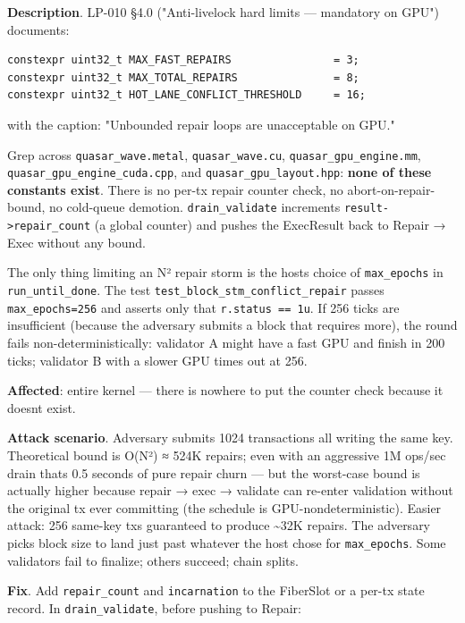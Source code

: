 \documentclass[
]{article}
\begin{document}
\textbf{Description}. LP-010 §4.0 ("Anti-livelock hard limits ---
mandatory on GPU") documents:

\begin{verbatim}
constexpr uint32_t MAX_FAST_REPAIRS                = 3;
constexpr uint32_t MAX_TOTAL_REPAIRS               = 8;
constexpr uint32_t HOT_LANE_CONFLICT_THRESHOLD     = 16;
\end{verbatim}

with the caption: "Unbounded repair loops are unacceptable on GPU."

Grep across \texttt{quasar\_wave.metal}, \texttt{quasar\_wave.cu},
\texttt{quasar\_gpu\_engine.mm}, \texttt{quasar\_gpu\_engine\_cuda.cpp},
and \texttt{quasar\_gpu\_layout.hpp}: \textbf{none of these constants
exist}. There is no per-tx repair counter check, no
abort-on-repair-bound, no cold-queue demotion. \texttt{drain\_validate}
increments \texttt{result-\textgreater{}repair\_count} (a global
counter) and pushes the ExecResult back to Repair → Exec without any
bound.

The only thing limiting an N² repair storm is the host\textquotesingle s
choice of \texttt{max\_epochs} in \texttt{run\_until\_done}. The test
\texttt{test\_block\_stm\_conflict\_repair} passes
\texttt{max\_epochs=256} and asserts only that
\texttt{r.status\ ==\ 1u}. If 256 ticks are insufficient (because the
adversary submits a block that requires more), the round fails
non-deterministically: validator A might have a fast GPU and finish in
200 ticks; validator B with a slower GPU times out at 256.

\textbf{Affected}: entire kernel --- there is nowhere to put the counter
check because it doesn\textquotesingle t exist.

\textbf{Attack scenario}. Adversary submits 1024 transactions all
writing the same key. Theoretical bound is O(N²) ≈ 524K repairs; even
with an aggressive 1M ops/sec drain that\textquotesingle s 0.5 seconds
of pure repair churn --- but the worst-case bound is actually higher
because repair → exec → validate can re-enter validation without the
original tx ever committing (the schedule is GPU-nondeterministic).
Easier attack: 256 same-key txs guaranteed to produce \textasciitilde32K
repairs. The adversary picks block size to land just past whatever the
host chose for \texttt{max\_epochs}. Some validators fail to finalize;
others succeed; chain splits.

\textbf{Fix}. Add \texttt{repair\_count} and \texttt{incarnation} to the
FiberSlot or a per-tx state record. In \texttt{drain\_validate}, before
pushing to Repair:
\end{document}
